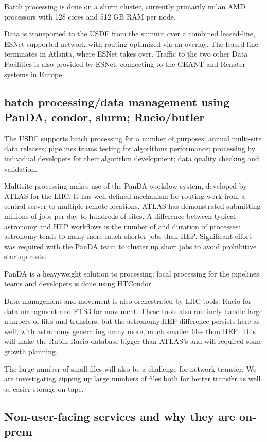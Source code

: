 Batch processing is done on a slurm cluster, currently primarily milan AMD
processors with 128 cores and 512 GB RAM per node.

Data is transported to the USDF from the summit over a combined
leased-line, ESNet supported network with routing optimized via an
overlay. The leased line terminates in Atlanta, where ESNet takes
over. Traffic to the two other Data Facilities is also provided by
ESNet, connecting to the GEANT and Renater systems in Europe.

\subsection{batch processing/data management using PanDA, condor,
  slurm; Rucio/butler}

The USDF supports batch processing for a number of purposes: annual
multi-site data releases; pipelines teams testing for algorithms
performance; processing by individual developers for their algorithm
development; data quality checking and validation.

Multisite processing makes use of the PanDA workflow system, developed
by ATLAS for the LHC. It has well defined mechanism for routing work
from a central server to multiple remote locations. ATLAS has
demonstrated submitting millions of jobs per day to hundreds of
sites. A difference between typical astronomy and HEP workflows is the
number of and duration of processes: astronomy tends to many more much
shorter jobs than HEP. Significant effort was required with the PanDA
team to cluster up short jobs to avoid prohibitive startup costs.

PanDA is a heavyweight solution to processing; local processing for
the pipelines teams and developers is done using HTCondor.

Data management and movement is also orchestrated by LHC tools: Rucio
for data managment and FTS3 for movement. These tools also routinely
handle large numbers of files and transfers, but the astronomy:HEP
difference persists here as well, with astronomy generating many more,
much smaller files than HEP. This will make the Rubin Rucio database
bigger than ATLAS's and will required some growth planning.

The large number of small files will also be a challenge for network
transfer. We are investigating zipping up large numbers of files both
for better transfer as well as easier storage on tape.

\subsection{Non-user-facing services and why they are on-prem}

